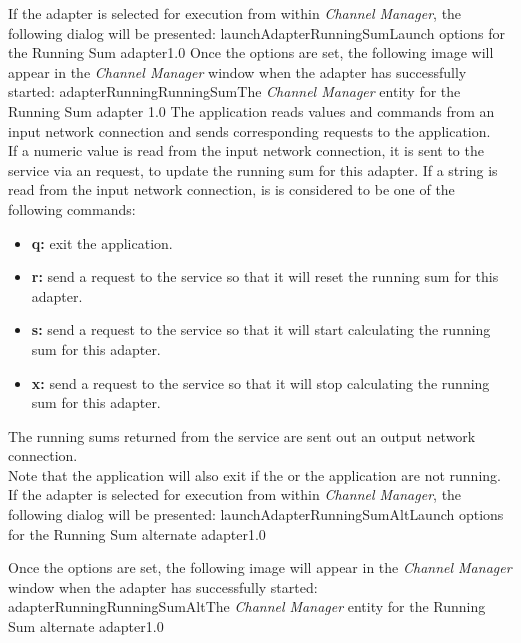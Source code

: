 If the adapter is selected for execution from within \emph{Channel Manager}, the following
dialog will be presented:
%
{launchAdapterRunningSum}{Launch options for the Running Sum adapter}{1.0}
\condPage{}
Once the options are set, the following image will appear in the \emph{Channel Manager}
window when the adapter has successfully started:
%
{adapterRunningRunningSum}{The \emph{Channel Manager} entity for the Running Sum adapter}%
{1.0}
The  application reads  values and
commands from an input \yarp{} network connection and sends corresponding requests to the
 application.\\

If a numeric value is read from the input \yarp{} network connection, it is sent to the
service via an  request, to update the running
sum for this adapter.
If a string is read from the input \yarp{} network connection, is is considered to be one
of the following commands:
\begin{itemize}
\item\textbf{q:} exit the application.
\item\exSp\textbf{r:} send a  request to the
service so that it will reset the running sum for this adapter.
\item\exSp\textbf{s:} send a  request to the
service so that it will start calculating the running sum for this adapter.
\item\exSp\textbf{x:} send a  request to the
service so that it will stop calculating the running sum for this adapter.
\end{itemize}
The running sums returned from the service are sent out an output \yarp{} network
connection.\\

Note that the application will also exit if the
 or the
 application are not running.
\condPage{}
If the adapter is selected for execution from within \emph{Channel Manager}, the following
dialog will be presented:
%
{launchAdapterRunningSumAlt}{Launch options for the Running Sum alternate adapter}{1.0}

Once the options are set, the following image will appear in the \emph{Channel Manager}
window when the adapter has successfully started:
%
{adapterRunningRunningSumAlt}{The \emph{Channel Manager} entity for the Running Sum
alternate adapter}{1.0}
\secondaryEnd
\appendixEnd{}

